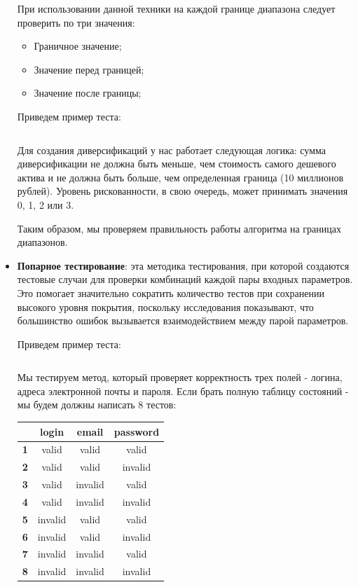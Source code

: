 \documentclass[a4paper, 14pt]{article}
\begin{document}
\begin{itemize}
    При использовании данной техники на каждой границе диапазона следует проверить по три значения:
    \begin{itemize}
        \item Граничное значение;
        \item Значение перед границей;
        \item Значение после границы;
    \end{itemize}

    Приведем пример теста:
    \small
    \inputminted[frame=single]{java}{./code/3.java}
    \large

    Для создания диверсификаций у нас работает следующая логика: сумма диверсификации не должна быть меньше, чем стоимость самого дешевого актива и не должна быть больше, чем определенная граница (10 миллионов рублей). Уровень рискованности, в свою очередь, может принимать значения 0, 1, 2 или 3.

    Таким образом, мы проверяем правильность работы алгоритма на границах диапазонов.

    \item \textbf{Попарное тестирование}: эта методика тестирования, при которой создаются тестовые случаи для проверки комбинаций каждой пары входных параметров. Это помогает значительно сократить количество тестов при сохранении высокого уровня покрытия, поскольку исследования показывают, что большинство ошибок вызывается взаимодействием между парой параметров.

    Приведем пример теста:
    \normalsize
    \inputminted[frame=single]{java}{./code/4.java}
    \large

    Мы тестируем метод, который проверяет корректность трех полей - логина, адреса электронной почты и пароля. Если брать полную таблицу состояний - мы будем должны написать 8 тестов:

    \begin{table}[H]
        \centering
        \begin{tabular}{|c|c|c|c|}
        \hline
        \textbf{}  & \textbf{login} & \textbf{email} & \textbf{password} \\ \hline
        \textbf{1} & valid          & valid          & valid             \\ \hline
        \textbf{2} & valid          & valid          & invalid           \\ \hline
        \textbf{3} & valid          & invalid        & valid             \\ \hline
        \textbf{4} & valid          & invalid        & invalid           \\ \hline
        \textbf{5} & invalid        & valid          & valid             \\ \hline
        \textbf{6} & invalid        & valid          & invalid           \\ \hline
        \textbf{7} & invalid        & invalid        & valid             \\ \hline
        \textbf{8} & invalid        & invalid        & invalid           \\ \hline
        \end{tabular}
    \end{table}


\end{itemize}
\end{document}
